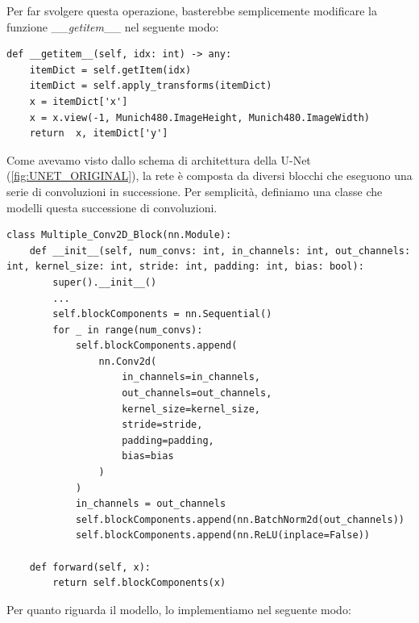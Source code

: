 Per far svolgere questa operazione, basterebbe semplicemente modificare la funzione 
\_\_\textit{getitem}\_\_ nel seguente modo:
\begin{lstlisting}
def __getitem__(self, idx: int) -> any:
    itemDict = self.getItem(idx)
    itemDict = self.apply_transforms(itemDict)
    x = itemDict['x']
    x = x.view(-1, Munich480.ImageHeight, Munich480.ImageWidth)
    return  x, itemDict['y'] 
\end{lstlisting}


Come avevamo visto dallo schema di architettura della U-Net (\ref{fig:UNET_ORIGINAL}), 
la rete è composta da diversi blocchi che eseguono una serie di convoluzioni in successione. 
Per semplicità, definiamo una classe 
che modelli questa successione di convoluzioni.

\begin{lstlisting}
class Multiple_Conv2D_Block(nn.Module):
    def __init__(self, num_convs: int, in_channels: int, out_channels: int, kernel_size: int, stride: int, padding: int, bias: bool):
        super().__init__()
        ...
        self.blockComponents = nn.Sequential()
        for _ in range(num_convs):  
            self.blockComponents.append(
                nn.Conv2d(
                    in_channels=in_channels, 
                    out_channels=out_channels, 
                    kernel_size=kernel_size, 
                    stride=stride, 
                    padding=padding, 
                    bias=bias
                )
            )      
            in_channels = out_channels
            self.blockComponents.append(nn.BatchNorm2d(out_channels))
            self.blockComponents.append(nn.ReLU(inplace=False))
                
    def forward(self, x):
        return self.blockComponents(x)
\end{lstlisting}
Per quanto riguarda il modello, lo implementiamo nel seguente modo:

